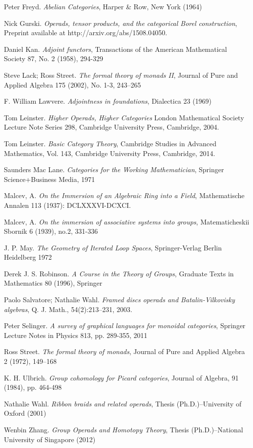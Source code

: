 \documentclass[a4paper,12pt,times,numbered,print,index]{Style/PhDThesisPSnPDF}
\numberwithin{equation}{section}
\theoremstyle{example}
\theoremstyle{named}
\begin{document}
\begin{thebibliography}{9}
Peter Freyd.
\textit{Abelian Categories}, 
Harper \& Row, New York (1964) 

Nick Gurski. 
\textit{Operads, tensor products, and the categorical Borel construction},
Preprint available at http://arxiv.org/abs/1508.04050.

Daniel Kan.
\textit{Adjoint functors},
Transactions of the American Mathematical Society 87, No. 2 (1958), 294-329 

Steve Lack; Ross Street.
\textit{The formal theory of monads II},
Journal of Pure and Applied Algebra 175 (2002), No. 1-3, 243–265

F. William Lawvere.
\textit{Adjointness in foundations},
Dialectica 23 (1969)

Tom Leinster.
\textit{Higher Operads, Higher Categories}
London Mathematical Society Lecture Note Series 298, Cambridge University Press, Cambridge, 2004.

Tom Leinster.
\textit{Basic Category Theory},
Cambridge Studies in Advanced Mathematics, Vol. 143, Cambridge University Press, Cambridge, 2014.

Saunders Mac Lane.
\textit{Categories for the Working Mathematician},
Springer Science+Business Media, 1971

Malcev, A.
\textit{On the Immersion of an Algebraic Ring into a Field},
Mathematische Annalen 113 (1937): DCLXXXVI-DCXCI. 

Malcev, A.
\textit{On the immersion of associative systems into groups},
Matematicheskii Sbornik 6 (1939), no.2, 331-336

J. P. May.
\textit{The Geometry of Iterated Loop Spaces},
Springer-Verlag Berlin Heidelberg 1972

Derek J. S. Robinson.
\textit{A Course in the Theory of Groups},
Graduate Texts in Mathematics 80 (1996), Springer

Paolo Salvatore; Nathalie Wahl. 
\textit{Framed discs operads and Batalin-Vilkovisky algebras},
Q. J. Math., 54(2):213–231, 2003.

Peter Selinger.
\textit{A survey of graphical languages for monoidal categories},
Springer Lecture Notes in Physics 813, pp. 289-355, 2011

Ross Street.
\textit{The formal theory of monads},
Journal of Pure and Applied Algebra 2 (1972), 149–168 

K. H. Ulbrich.
\textit{Group cohomology for Picard categories},
Journal of Algebra, 91 (1984), pp. 464-498 

Nathalie Wahl.
\textit{Ribbon braids and related operads},
Thesis (Ph.D.)–University of Oxford (2001) 
 
Wenbin Zhang.
\textit{Group Operads and Homotopy Theory},
Thesis (Ph.D.)–National University of Singapore (2012)

\end{thebibliography}
\end{document}
